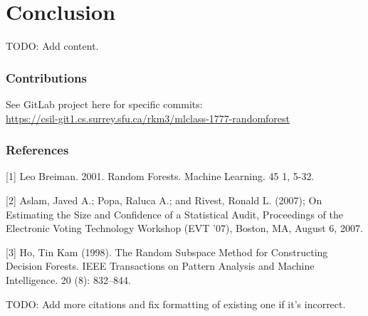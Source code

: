 \documentclass{article} %
\begin{document}
\section{Conclusion}
TODO: Add content.

\subsubsection*{Contributions}
See GitLab project here for specific commits:\\
\href{
    https://csil-git1.cs.surrey.sfu.ca/rkm3/mlclass-1777-randomforest
}{
    https://csil-git1.cs.surrey.sfu.ca/rkm3/mlclass-1777-randomforest
}

\subsubsection*{References}


\small{
[1] Leo Breiman. 2001. Random Forests. Machine Learning. 45 1, 5-32.

[2]  Aslam, Javed A.; Popa, Raluca A.; and Rivest, Ronald L. (2007); On Estimating the Size and Confidence of a Statistical Audit, Proceedings of the Electronic Voting Technology Workshop (EVT '07), Boston, MA, August 6, 2007.

[3]  Ho, Tin Kam (1998). The Random Subspace Method for Constructing Decision Forests. IEEE Transactions on Pattern Analysis and Machine Intelligence. 20 (8): 832–844. 

TODO: Add more citations and fix formatting of existing one if it's incorrect.
}
\end{document}
